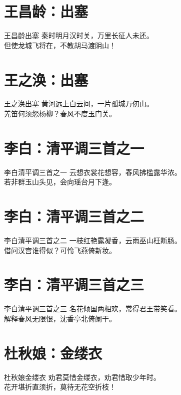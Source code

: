 \documentclass[12pt,oneside,a5paper]{book}
\begin{document}
\chapter{王昌龄：出塞}
\begin{poemzh}{王昌龄}{出塞}
秦时明月汉时关，万里长征人未还。\\
但使龙城飞将在，不教胡马渡阴山！\\ 
\end{poemzh}

\chapter{王之涣：出塞}
\begin{poemzh}{王之涣}{出塞}
黄河远上白云间，一片孤城万仞山。\\
羌笛何须怨杨柳？春风不度玉门关。\\ 
\end{poemzh}

\chapter{李白：清平调三首之一}
\begin{poemzh}{李白}{清平调三首之一}
云想衣裳花想容，春风拂槛露华浓。\\
若非群玉山头见，会向瑶台月下逢。\\ 
\end{poemzh}

\chapter{李白：清平调三首之二}
\begin{poemzh}{李白}{清平调三首之二}
一枝红艳露凝香，云雨巫山枉断肠。\\
借问汉宫谁得似？可怜飞燕倚新妆。\\ 
\end{poemzh}

\chapter{李白：清平调三首之三}
\begin{poemzh}{李白}{清平调三首之三}
名花倾国两相欢，常得君王带笑看。\\
解释春风无限恨，沈香亭北倚阑干。\\ 
\end{poemzh}

\chapter{杜秋娘：金缕衣}
\begin{poemzh}{杜秋娘}{金缕衣}
劝君莫惜金缕衣，劝君惜取少年时。\\
花开堪折直须折，莫待无花空折枝！\\ 
\end{poemzh}



\end{document}
